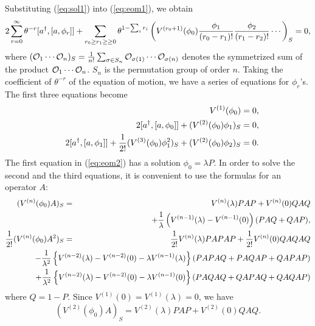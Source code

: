 \documentclass[a4paper,12pt]{article}
\begin{document}
Substituting (\ref{eq:sol1}) into (\ref{eq:eom1}), we obtain
\begin{equation}
 2\sum_{r=0}^{\infty} \theta^{-r} [a^{\dagger},[a,\phi_{r}]]
+\sum_{r_{0}\geq r_{1}\geq \geq 0}
\theta^{1-\sum_{i}r_{i}} \left(
V^{(r_{0}+1)}(\phi_{0})
{\phi_{1}\over (r_{0}-r_{1})!} {\phi_{2}\over (r_{1}-r_{2})!}
\cdots
\right)_{S}=0,
\end{equation}
where $({\cal O}_{1}\cdots {\cal O}_{n})_{S}={1\over n!}
\sum_{\sigma\in S_{n}}{\cal O}_{\sigma(1)}\cdots {\cal O}_{\sigma(n)}$
denotes the symmetrized sum of the product
${\cal O}_{1}\cdots {\cal O}_{n}$.
$S_{n}$ is the permutation group of order $n$.
Taking the coefficient of $\theta^{-r}$ of the equation of motion,
we have a series of equations for $\phi_{r}$'s.
The first three equations become
\begin{eqnarray}
&& V^{(1)}(\phi_{0})=0,\nonumber\\
&& 2[a^{\dagger},[a,\phi_{0}]]+(V^{(2)}(\phi_0)\phi_1)_{S}=0,\nonumber\\
&& 2[a^{\dagger},[a,\phi_{1}]]+{1\over2!}(V^{(3)}(\phi_0)\phi_1^2)_{S}
+(V^{(2)}(\phi_0)\phi_2)_{S}=0.
\label{eq:eom2}
\end{eqnarray}
The first equation in (\ref{eq:eom2}) has a solution $\phi_{0}=\lambda
P$.
In order to solve the second and the third equations, it is convenient to
use the formulas for an operator $A$:
\begin{eqnarray}
 (V^{(n)}(\phi_{0})A)_{S}&=& V^{(n)}(\lambda) PAP+V^{(n)}(0)QAQ\nonumber\\
&&
+{1\over\lambda}\left(V^{(n-1)}(\lambda)-V^{(n-1)}(0) \right)
(PAQ+QAP),\\
{1\over2!}  (V^{(n)}(\phi_{0})A^2)_{S}&=&
{1\over2!} V^{(n)}(\lambda)PAPAP+{1\over2!}V^{(n)}(0)QAQAQ\nonumber\\
&&\hspace{-2cm}
-{1\over\lambda^2} \left\{
V^{(n-2)}(\lambda)-V^{(n-2)}(0)-\lambda V^{(n-1)} (\lambda)
\right\} (PAPAQ+PAQAP+QAPAP)\nonumber\\
&&\hspace{-2cm}
+{1\over\lambda^2} \left\{
V^{(n-2)}(\lambda)-V^{(n-2)}(0)-\lambda V^{(n-1)} (0)
\right\} (PAQAQ+QAPAQ+QAQAP)
\nonumber\\
\label{eq:ident1}
\end{eqnarray}
where $Q=1-P$.
Since $V^{(1)}(0)=V^{(1)}(\lambda)=0$, we have
\begin{equation}
 (V^{(2)}(\phi_{0})A)_{S}=V^{(2)}(\lambda) PAP+V^{(2)}(0)QAQ.
\end{equation}
\end{document}

